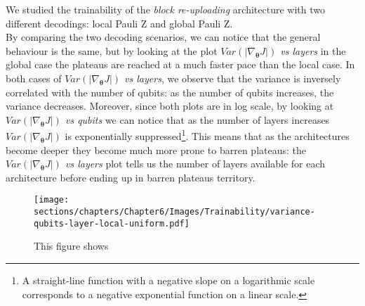We studied the trainability of the \textit{block re-uploading} architecture with two different decodings:
local Pauli Z and global Pauli Z.\\ 
By comparing the two decoding scenarios, we can notice that the general behaviour is the same, 
but by looking at the plot \textit{$Var(|\nabla_{\bm{\theta}}J|)$ vs layers} in the global case 
the plateaus are reached at a much faster pace than the local case.
In both cases of \textit{$Var(|\nabla_{\bm{\theta}}J|)$ vs layers}, we observe that the variance 
is inversely correlated with the number of qubits: as the number of qubits increases, 
the variance decreases.
Moreover, since both plots are in log scale, by looking at 
\textit{$Var(|\nabla_{\bm{\theta}}J|)$ vs qubits} we can notice that as the number of layers increases 
$Var(|\nabla_{\bm{\theta}}J|)$ is exponentially suppressed\footnote[1]{A straight-line function 
with a negative slope on a logarithmic scale corresponds to a negative exponential function 
on a linear scale.}.
This means that as the architectures become deeper they become much more prone to barren plateaus:
the \textit{$Var(|\nabla_{\bm{\theta}}J|)$ vs layers} plot tells us the number of layers available for
each architecture before ending up in barren plateaus territory.


\begin{figure}[h]
    \centering
    \texttt{[image: sections/chapters/Chapter6/Images/Trainability/variance-qubits-layer-local-uniform.pdf]}
    \caption{This figure shows}
    \label{fig:local-gauss}
\end{figure}